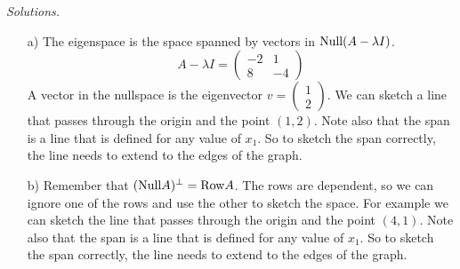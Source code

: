 \ifnum {} {\color{DarkBlue} \textit{Solutions.} \begin{itemize}
    \item[a)] The eigenspace is the space spanned by vectors in $\text{Null}(A - \lambda I)$. $$A - \lambda I = \begin{pmatrix}-2&1\\8&-4 \end{pmatrix}$$ A vector in the nullspace is the eigenvector $v = \begin{pmatrix} 1\\2\end{pmatrix}$. We can sketch a line that passes through the origin and the point $(1,2)$. Note also that the span is a line that is defined for any value of $x_1$. So to sketch the span correctly, the line needs to extend to the edges of the graph. 
\item[b)] Remember that $(\text{Null} A)^{\perp} = \text{Row} A$. The rows are dependent, so we can ignore one of the rows and use the other to sketch the space. For example we can sketch the line that passes through the origin and the point $(4,1)$. Note also that the span is a line that is defined for any value of $x_1$. So to sketch the span correctly, the line needs to extend to the edges of the graph. 
\end{itemize}
    \vspace{-12pt}
    \begin{center}
    \qquad
    \end{center}   }
   \else
    \vspace{-12pt}
    \begin{center}
    \qquad
    \end{center}   
   \fi
\fi



